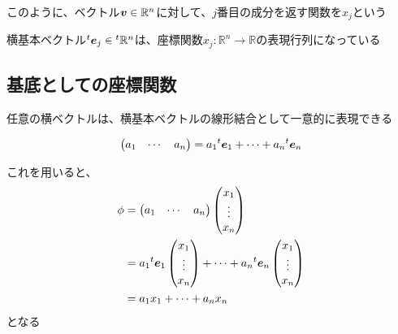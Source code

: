 \documentclass[../../../topic_linear-algebra]{subfiles}
\begin{document}
このように、ベクトル$\vb*{v} \in \mathbb{R}^n$に対して、$j$番目の成分を返す関数を$x_j$という

\br

横基本ベクトル${}^t\vb*{e}_j \in {}^t\mathbb{R}^n$は、座標関数$x_j\colon \mathbb{R}^n \to \mathbb{R}$の表現行列になっている

\subsection{基底としての座標関数}

任意の横ベクトルは、横基本ベクトルの線形結合として一意的に表現できる

\begin{equation*}
  \begin{pmatrix}
    a_1 & \cdots & a_n
  \end{pmatrix}
  = a_1 {}^t\vb*{e}_1 + \cdots + a_n {}^t\vb*{e}_n
\end{equation*}

これを用いると、
\begin{align*}
  \phi & = \begin{pmatrix}
             a_1 & \cdots & a_n
           \end{pmatrix} \begin{pmatrix}
                           x_1    \\
                           \vdots \\
                           x_n
                         \end{pmatrix}                                                \\
       & = a_1 {}^t\vb*{e}_1 \begin{pmatrix}
                               x_1    \\
                               \vdots \\
                               x_n
                             \end{pmatrix} + \cdots + a_n {}^t\vb*{e}_n \begin{pmatrix}
                                                                          x_1    \\
                                                                          \vdots \\
                                                                          x_n
                                                                        \end{pmatrix} \\
       & = a_1 x_1 + \cdots + a_n x_n
\end{align*}
となる
\end{document}
